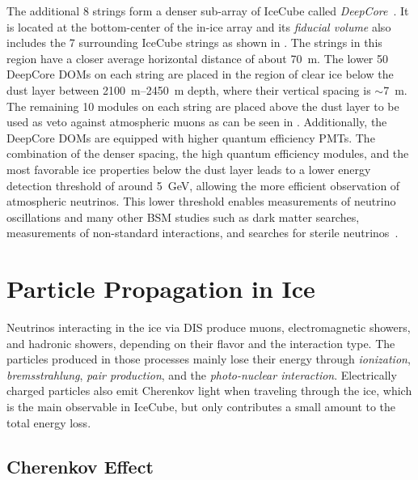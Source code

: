 The additional 8 strings form a denser sub-array of IceCube called \textit{DeepCore}~. It is located at the bottom-center of the in-ice array and its \textit{fiducial volume} also includes the 7 surrounding IceCube strings as shown in . The strings in this region have a closer average horizontal distance of about \SI{70}{\meter}. The lower 50 DeepCore DOMs on each string are placed in the region of clear ice below the dust layer between \SIrange{2100}{2450}{\meter} depth, where their vertical spacing is $\sim$\SI{7}{\meter}. The remaining 10 modules on each string are placed above the dust layer to be used as veto against atmospheric muons as can be seen in . Additionally, the DeepCore DOMs are equipped with higher quantum efficiency PMTs. The combination of the denser spacing, the high quantum efficiency modules, and the most favorable ice properties below the dust layer leads to a lower energy detection threshold of around \SI{5}{GeV}, allowing the more efficient observation of atmospheric neutrinos. This lower threshold enables measurements of neutrino oscillations and many other BSM studies such as dark matter searches, measurements of non-standard interactions, and searches for sterile neutrinos~\cite{DeepCore_design_Abbasi2012615}.


\section{Particle Propagation in Ice} 

Neutrinos interacting in the ice via DIS produce muons, electromagnetic showers, and hadronic showers, depending on their flavor and the interaction type. The particles produced in those processes mainly lose their energy through \textit{ionization}, \textit{bremsstrahlung}, \textit{pair production}, and the \textit{photo-nuclear interaction}. Electrically charged particles also emit Cherenkov light when traveling through the ice, which is the main observable in IceCube, but only contributes a small amount to the total energy loss.


\subsection{Cherenkov Effect} 

